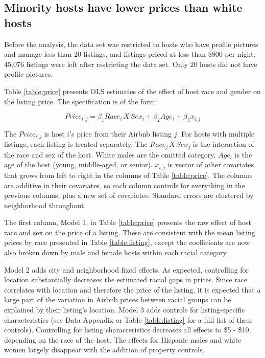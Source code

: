 \subsection{Minority hosts have lower prices than white hosts} 
	\label{result1}
Before the analysis, the data set was restricted to hosts who have profile pictures and manage less than 20 listings, and listings priced at less than \$800 per night. 45,076 listings were left after restricting the data set. Only 20 hosts did not have profile pictures.

Table \ref{table:price} presents OLS estimates of the effect of host race and gender on the listing price. The specification is of the form: 

\[ Price_{i,j} = \beta_1 Race_{i}\,X \,Sex_i + \beta_2 Age_i + \beta_3 x_{i,j}\]

The $Price_{i,j}$ is host $i$'s price from their Airbnb listing $j$. For hosts with multiple listings, each listing is treated separately. The $Race_{j}\,X \,Sex_j$ is the interaction of the race and sex of the host. White males are the omitted category. $Age_i$ is the age of the host (young, middle-aged, or senior). $x_{i,j}$ is vector of other covariates that grows from left to right in the columns of Table \ref{table:price}. The columns are additive in their covariates, so each column controls for everything in the previous columns, plus a new set of covariates. Standard errors are clustered by neighborhood throughout.

The first column, Model 1, in Table \ref{table:price} presents the raw effect of host race and sex on the price of a listing. These are consistent with the mean listing prices by race presented in Table \ref{table:listing}, except the coefficients are now also broken down by male and female hosts within each racial category.

Model 2 adds city and neighborhood fixed effects. As expected, controlling for location substantially decreases the estimated racial gaps in prices. Since race correlates with location and therefore the price of the listing, it is expected that a large part of the variation in Airbnb prices between racial groups can be explained by their listing's location. Model 3 adds controls for listing-specific characteristics (see Data Appendix or Table \ref{table:listing} for a full list of these controls). Controlling for listing characteristics decreases all effects to \$5 - \$10, depending on the race of the host. The effects for Hispanic males and white women largely disappear with the addition of property controls. 

